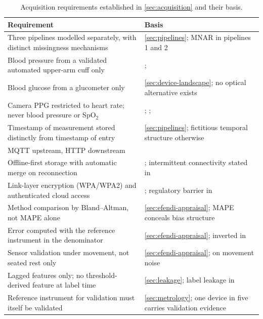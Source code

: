 \documentclass[12pt,a4paper,oneside]{report}
\begin{document}
\begin{table}[htbp]
\centering\footnotesize
\caption{Acquisition requirements established in \cref{sec:acquisition} and their basis.}\label{tab:spec21}
\begin{tabularx}{\textwidth}{@{}X >{\raggedright\arraybackslash}p{5.9cm}@{}}
\toprule
\textbf{Requirement} & \textbf{Basis} \\
\midrule
Three pipelines modelled separately, with distinct missingness mechanisms & \cref{sec:pipelines}; MNAR in pipelines 1 and 2 \\
Blood pressure from a validated automated upper-arm cuff only & \textcite{who2023hypertension}; \textcite{alessa2019} \\
Blood glucose from a glucometer only & \cref{sec:device-landscape}; no optical alternative exists \\
Camera PPG restricted to heart rate; never blood pressure or SpO$_2$ & \textcite{who2023hypertension}; \textcite{alessa2019}; \textcite{navarro2023} \\
Timestamp of measurement stored distinctly from timestamp of entry & \cref{sec:pipelines}; fictitious temporal structure otherwise \\
MQTT upstream, HTTP downstream & \textcite{efendi2025} \\
Offline-first storage with automatic merge on reconnection & \textcite{efendi2025}; intermittent connectivity stated in \textcite{cadrage2026} \\
Link-layer encryption (WPA/WPA2) and authenticated cloud access & \textcite{efendi2025}; regulatory barrier in \textcite{dodoo2022} \\
Method comparison by Bland--Altman, not MAPE alone & \cref{sec:efendi-appraisal}; MAPE conceals bias structure \\
Error computed with the reference instrument in the denominator & \cref{sec:efendi-appraisal}; inverted in \textcite{efendi2025} \\
Sensor validation under movement, not seated rest only & \cref{sec:efendi-appraisal}; \textcite{navarro2023} on movement noise \\
Lagged features only; no threshold-derived feature at label time & \cref{sec:leakage}; label leakage in \textcite{efendi2025} \\
Reference instrument for validation must itself be validated & \cref{sec:metrology}; one device in five carries validation evidence \\
\bottomrule
\end{tabularx}
\end{table}
\end{document}
